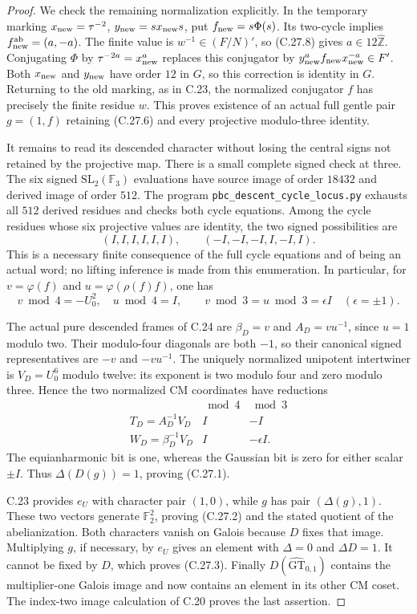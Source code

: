 \begin{proof}
We check the remaining normalization explicitly. In the
temporary marking $x_{\rm new}=\tau^{-2}$,
$y_{\rm new}=s x_{\rm new}s$, put
$f_{\rm new}=s\Phi(s)$. Its two-cycle implies
$f_{\rm new}^{\rm ab}=(a,-a)$.
The finite value is $w^{-1}\in(F/N)'$, so (C.27.8)
gives $a\in12\widehat{\mathbb Z}$.
Conjugating $\Phi$ by $\tau^{-2a}=x_{\rm new}^a$
replaces this conjugator by
$y_{\rm new}^a f_{\rm new}x_{\rm new}^{-a}\in F'$.
Both $x_{\rm new}$ and $y_{\rm new}$ have order $12$
in $G$, so this correction is identity in $G$.
Returning to the old marking, as in C.23, the normalized
conjugator $f$ has precisely the finite residue $w$.
This proves existence of an actual full gentle pair
$g=(1,f)$ retaining (C.27.6) and every projective
modulo-three identity.

It remains to read its descended character without losing
the central signs not retained by the projective map.
There is a small complete signed check at three.
The six signed $\mathrm{SL}_2(\mathbb F_3)$ evaluations
have source image of order $18432$ and derived image of
order $512$. The program
\texttt{pbc\_descent\_cycle\_locus.py} exhausts all $512$
derived residues and checks both cycle equations.
Among the cycle residues whose six projective values
are identity, the two signed possibilities are
\[
 (I,I,I,I,I,I),\qquad
 (-I,-I,-I,I,-I,I).
 \tag{C.27.14}
\]
This is a necessary finite consequence of the full cycle
equations and of being an actual word; no lifting inference
is made from this enumeration.
In particular, for
$v=\varphi(f)$ and $u=\varphi(\rho(f)f)$, one has
\[
 v\bmod4=-U_0^2,\quad u\bmod4=I,\qquad
                 v\bmod3=u\bmod3=\epsilon I
                 \quad(\epsilon=\pm1).
 \tag{C.27.15}
\]

The actual pure descended frames of C.24 are
$\beta_D=v$ and $A_D=vu^{-1}$, since $u=1$ modulo two.
Their modulo-four diagonals are both $-1$, so their
canonical signed representatives are $-v$ and $-vu^{-1}$.
The uniquely normalized unipotent intertwiner is
$V_D=U_0^6$ modulo twelve: its exponent is two modulo
four and zero modulo three. Hence the two normalized
CM coordinates have reductions
\[
 \begin{array}{c|cc}
       &\bmod4&\bmod3\\\hline
 T_D=A_D^{-1}V_D&I&-I\\
 W_D=\beta_D^{-1}V_D&I&-\epsilon I .
 \end{array}
 \tag{C.27.16}
\]
The equianharmonic bit is one, whereas the Gaussian bit
is zero for either scalar $\pm I$. Thus
$\Delta(D(g))=1$, proving (C.27.1).

C.23 provides $e_U$ with character pair $(1,0)$, while
$g$ has pair $(\Delta(g),1)$. These two vectors generate
$\mathbb F_2^2$, proving (C.27.2) and the stated quotient
of the abelianization. Both characters vanish on Galois
because $D$ fixes that image. Multiplying $g$, if necessary,
by $e_U$ gives an element with $\Delta=0$ and
$\Delta D=1$. It cannot be fixed by $D$, which proves
(C.27.3). Finally $D(\widehat{\mathrm{GT}}_{0,1})$
contains the multiplier-one Galois image and now contains
an element in its other CM coset. The index-two image
calculation of C.20 proves the last assertion.
\end{proof}

